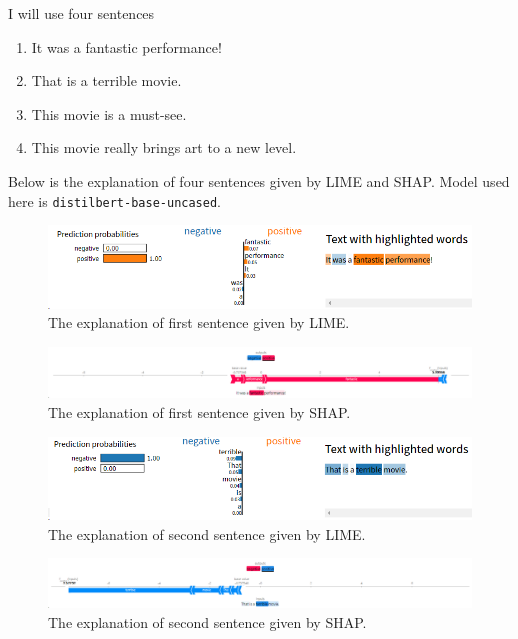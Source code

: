 \documentclass{article}[12pt]
\begin{document}
I will use four sentences 

\begin{enumerate}
	\item It was a fantastic performance!
	\item That is a terrible movie.
	\item This movie is a must-see.
	\item This movie really brings art to a new level.	
\end{enumerate}

Below is the explanation of four sentences given by LIME and SHAP. Model used here is \texttt{distilbert-base-uncased}.

\begin{figure}[htbp]
	\centering
	\includegraphics[width=\linewidth]{figure/lime-simple-1}
	\caption{The explanation of first sentence given by LIME.}
	\label{fig:lime-simple-1}
\end{figure}

\begin{figure}[htbp]
	\centering
	\includegraphics[width=\linewidth]{figure/shap-simple-1}
	\caption{The explanation of first sentence given by SHAP.}
	\label{fig:shap-simple-1}
\end{figure}

\begin{figure}[htbp]
	\centering
	\includegraphics[width=\linewidth]{figure/lime-simple-2}
	\caption{The explanation of second sentence given by LIME.}
	\label{fig:lime-simple-2}
\end{figure}

\begin{figure}[htbp]
	\centering
	\includegraphics[width=\linewidth]{figure/shap-simple-2}
	\caption{The explanation of second sentence given by SHAP.}
	\label{fig:shap-simple-2}
\end{figure}
\end{document}
